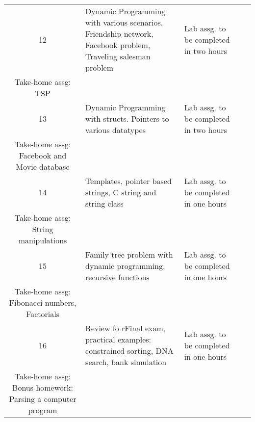 \documentclass[11pt]{article}
\begin{document}
\begin{center}
\begin{tabular*}{0.94\textwidth}{cl|p{2.25in}|r|l}
\hline
         12  &  Dynamic Programming with various scenarios.  Friendship network, Facebook problem, Traveling salesman problem                         &  Lab assg. to be completed in two hours \\ Take-home assg: TSP                                                                                            \\
\hline
         13  &  Dynamic Programming with structs.  Pointers to various datatypes                                                                      &  Lab assg. to be completed in two hours \\ Take-home assg: Facebook and Movie database                                                                    \\
\hline
         14  &  Templates, pointer based strings, C string and string class                                                                           &  Lab assg. to be completed in one hours \\ Take-home assg: String manipulations                                                                           \\
\hline
         15  &  Family tree problem with dynamic programming, recursive functions                                                                     &  Lab assg. to be completed in one hours \\ Take-home assg: Fibonacci numbers, Factorials                                                                  \\
\hline
         16  &  Review fo rFinal exam, practical examples: constrained sorting, DNA search, bank simulation                                           &  Lab assg. to be completed in one hours \\ Take-home assg: Bonus homework: Parsing a computer program                                                     \\
\hline
\end{tabular*}
\end{center}
\end{document}
